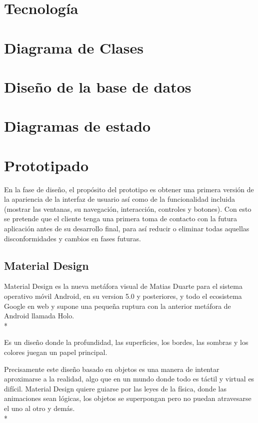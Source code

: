 \documentclass[../pfc.tex]{subfiles}
\begin{document}
	
	
	\section{Tecnología}
	
	\section{Diagrama de Clases}
	
	\section{Diseño de la base de datos}
	
	\section{Diagramas de estado}
	
	\section{Prototipado}
	
	En la fase de diseño, el propósito del prototipo es obtener una primera versión de la apariencia de la interfaz de usuario así como de la funcionalidad incluida (mostrar las ventanas, su navegación, interacción, controles y botones). Con esto se pretende que el cliente tenga una primera toma de contacto con la futura aplicación antes de su desarrollo final, para así reducir o eliminar todas aquellas disconformidades y cambios en fases futuras.
	
		\subsection{Material Design}
		Material Design es la nueva metáfora visual de Matias Duarte para el sistema operativo móvil Android, en su version 5.0 y posteriores, y todo el ecosistema Google en web y supone una pequeña ruptura con la anterior metáfora de Android llamada Holo. \\*
		
		Es un diseño donde la profundidad, las superficies, los bordes, las sombras y los colores juegan un papel principal.
		
		Precisamente este diseño basado en objetos es una manera de intentar aproximarse a la realidad, algo que en un mundo donde todo es táctil y virtual es difícil. Material Design quiere guiarse por las leyes de la física, donde las animaciones sean lógicas, los objetos se superpongan pero no puedan atravesarse el uno al otro y demás.\\*
		
\end{document}
